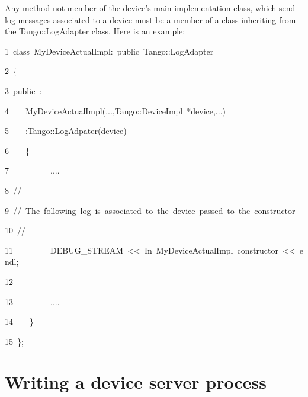 Any method not member of the device's main implementation class, which
send log messages associated to a device must be a member of a class
inheriting from the Tango::LogAdapter class. Here is an example:


\begin{lyxcode}
1~class~MyDeviceActualImpl:~public~Tango::LogAdapter

2~\{

3~public~:

4~~~~MyDeviceActualImpl(...,Tango::DeviceImpl~{*}device,...)

5~~~~:Tango::LogAdpater(device)

6~~~~\{

7~~~~~~~~~~....

8~//

9~//~The~following~log~is~associated~to~the~device~passed~to~the~constructor

10~//

11~~~~~~~~~DEBUG\_STREAM~<\textcompwordmark{}<~\textquotedbl{}In~MyDeviceActualImpl~constructor\textquotedbl{}~<\textcompwordmark{}<~endl;

12~

13~~~~~~~~~....

14~~~~\}

15~\};
\end{lyxcode}


\section{Writing a device server process\label{Writing_chapter}}

